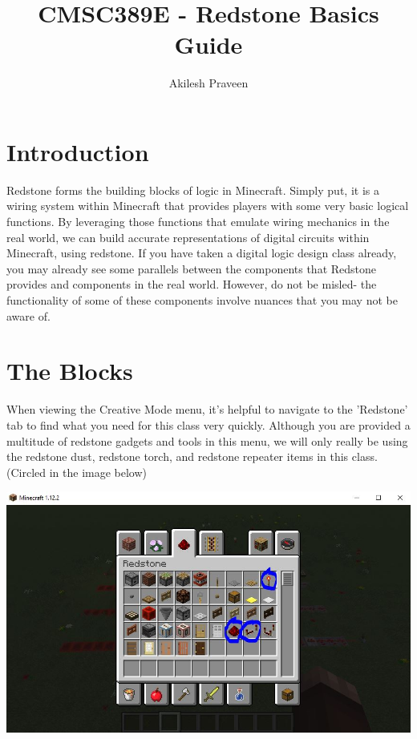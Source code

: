 \documentclass{article}
\title{CMSC389E - Redstone Basics Guide}
\author{Akilesh Praveen}
\date{}
\begin{document}
\maketitle

\section{Introduction}

Redstone forms the building blocks of logic in Minecraft. Simply put, it is a wiring system within Minecraft that provides players with some very basic logical functions. By leveraging those functions that emulate wiring mechanics in the real world, we can build accurate representations of digital circuits within Minecraft, using redstone.
\newline\newline
If you have taken a digital logic design class already, you may already see some parallels between the components that Redstone provides and components in the real world. However, do not be misled- the functionality of some of these components involve nuances that you may not be aware of.

\section{The Blocks}

When viewing the Creative Mode menu, it's helpful to navigate to the 'Redstone' tab to find what you need for this class very quickly. Although you are provided a multitude of redstone gadgets and tools in this menu, we will only really be using the redstone dust, redstone torch, and redstone repeater items in this class. (Circled in the image below)
\newline

\includegraphics[width=\textwidth]{misc1_1}
\end{document}
